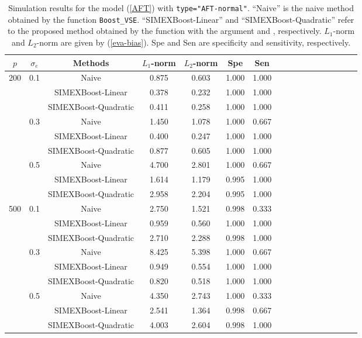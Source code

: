  \begin{table}[!ht]
       \huge
     \caption{Simulation results for the model (\ref{AFT}) with \texttt{type="AFT-normal"}. ``Naive'' is the naive method obtained by the function \texttt{Boost\_VSE}. ``SIMEXBoost-Linear'' and ``SIMEXBoost-Quadratic'' refer to the proposed method obtained by the function  with the argument  and , respectively. $L_1$-norm and $L_2$-norm are given by (\ref{eva-bias}). Spe and Sen are specificity and sensitivity, respectively. } \label{tab:Sim-4}


 \scriptsize

\center
 \begin{tabular}{c c c c  ccccccccccccc}


 \hline
$p$  & $\sigma_e$  & Methods & $L_1$-norm & $L_2$-norm & Spe & Sen \\
\hline
200 & 0.1 & Naive & 0.875 & 0.603 & 1.000 & 1.000 \\
 &  & SIMEXBoost-Linear & 0.378 & 0.232 & 1.000 & 1.000 \\
 &  & SIMEXBoost-Quadratic & 0.411 & 0.258 & 1.000 & 1.000 \\
 & 0.3 & Naive & 1.450 & 1.078 & 1.000 & 0.667 \\
 &  & SIMEXBoost-Linear & 0.400 & 0.247 & 1.000 & 1.000 \\
 &  & SIMEXBoost-Quadratic & 0.877 & 0.605 & 1.000 & 1.000 \\
 & 0.5 & Naive & 4.700 & 2.801 & 1.000 & 0.667 \\
 &  & SIMEXBoost-Linear & 1.614 & 1.179 & 0.995 & 1.000 \\
 &  & SIMEXBoost-Quadratic & 2.958 & 2.204 & 0.995 & 1.000 \\
500 & 0.1 & Naive & 2.750 & 1.521 & 0.998 & 0.333 \\
 &  & SIMEXBoost-Linear & 0.959 & 0.560 & 1.000 & 1.000 \\
 &  & SIMEXBoost-Quadratic & 2.710 & 2.288 & 0.998 & 1.000 \\
 & 0.3 & Naive & 8.425 & 5.398 & 1.000 & 0.667 \\
 &  & SIMEXBoost-Linear & 0.949 & 0.554 & 1.000 & 1.000 \\
 &  & SIMEXBoost-Quadratic & 0.820 & 0.518 & 1.000 & 1.000 \\
 & 0.5 & Naive & 4.350 & 2.743 & 1.000 & 0.333 \\
 &  & SIMEXBoost-Linear & 2.541 & 1.364 & 0.998 & 0.667 \\
 &  & SIMEXBoost-Quadratic & 4.003 & 2.604 & 0.998 & 1.000 \\

\hline    


\end{tabular}

\end{table}


